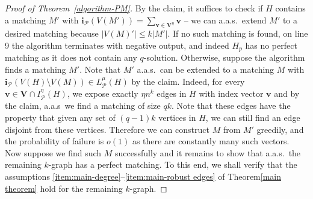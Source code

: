 \documentclass[11pt, letterpaper]{amsart}
\theoremstyle{plain}
\numberwithin{equation}{section}
\theoremstyle{definition}
\newcommand{\red}{\textcolor[rgb]{1.00,0.00,0.00}}
\renewcommand{\vec}[1]{{\mathbf #1}}
\begin{document}
\begin{proof}[Proof of Theorem~\ref{algorithm-PM}]
By the claim, it suffices to check if $H$ contains a matching $M'$ with $\vec{i}_{\mathcal{P}}(V(M'))= \sum_{\vec{v}\in \vec{V}^\eta}\vec{v}$ -- we can a.a.s.~extend $M'$ to a desired matching because $|V(M)'|\le k|M'|$.
If no such matching is found, on line 9 the algorithm terminates with negative output, and indeed $H_p$ has no perfect matching as it does not contain any $q$-solution.
Otherwise, suppose the algorithm finds a matching $M'$.
Note that $M'$ a.a.s.~can be extended to a matching $M$ with $ {\vec{i}}_{\mathcal{P}}(V(H)\setminus V(M)) \in L^{\mu}_{\mathcal{P}}(H) $ by the claim.
Indeed, for every \(\vec{v}\in \vec{V}\cap I^{\eta}_{\mathcal{P}}(H)\), we expose exactly \(\eta n^k\) edges in \(H\) with index vector \(\vec{v}\) and by the claim, a.a.s~we find a matching of size \(qk\).
Note that these edges have the property that given any set of $(q-1)k$ vertices in $H$, we can still find an edge disjoint from these vertices.
Therefore we can construct $M$ from $M'$ greedily, and the probability of failure is $o(1)$ as there are constantly many such vectors.
Now suppose we find such $M$ successfully and  
it remains to show that a.a.s.~the remaining $k$-graph has a perfect matching. To this end, we shall verify that the assumptions \ref{item:main-degree}--\ref{item:main-robust edges} of Theorem\ref{main theorem} hold for the remaining $k$-graph. %


\end{proof}
\end{document}
